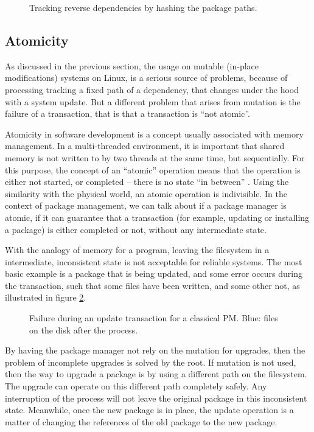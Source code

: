 \begin{figure}[hbtp]
    \centerfloat
    
    \caption{Tracking reverse dependencies by hashing the package paths.}
    \label{fig:nginx_miq}
\end{figure}

\FloatBarrier
\subsection{Atomicity}
\label{sec:atomicity}

As discussed in the previous section, the usage on mutable
(in-place modifications) systems on Linux, is a serious
source of problems, because of processing tracking a fixed
path of a dependency, that changes under the hood with a
system update. But a different problem that arises from
mutation is the failure of a transaction, that is that a
transaction is ``not atomic''.

Atomicity in software development is a concept usually
associated with memory management. In a multi-threaded
environment, it is important that shared memory is not
written to by two threads at the same time, but
sequentially. For this purpose, the concept of an ``atomic''
operation means that the operation is either not started, or
completed -- there is no state ``in between''
\cite{neelakantamHardwareAtomicityReliable2007} . Using the
similarity with the physical world, an atomic operation is
indivisible.
In the context of package management, we can talk about if a
package manager is atomic, if it can guarantee that a
transaction (for example, updating or installing a package)
is either completed or not, without any intermediate state.

With the analogy of memory for a program, leaving the
filesystem in a intermediate, inconsistent state is not
acceptable for reliable systems. The most basic example is a
package that is being updated, and some error occurs during
the transaction, such that some files have been written, and
some other not, as illustrated in figure
\ref{fig:atomicity}.


\begin{figure}[hbt]
    \centerfloat
    
    \caption{Failure during an update transaction for a
    classical \ac{PM}. Blue: files on the disk after the process.}
    \label{fig:atomicity}
\end{figure}

By having the package manager not rely on the mutation for
upgrades, then the problem of incomplete upgrades is solved
by the root. If mutation is not used, then the way to
upgrade a package is by using a different path on the
filesystem. The upgrade can operate on this different path
completely safely. Any interruption of the process will not
leave the original package in this inconsistent state.
Meanwhile, once the new package is in place, the update
operation is a matter of changing the references of the old
package to the new package.

